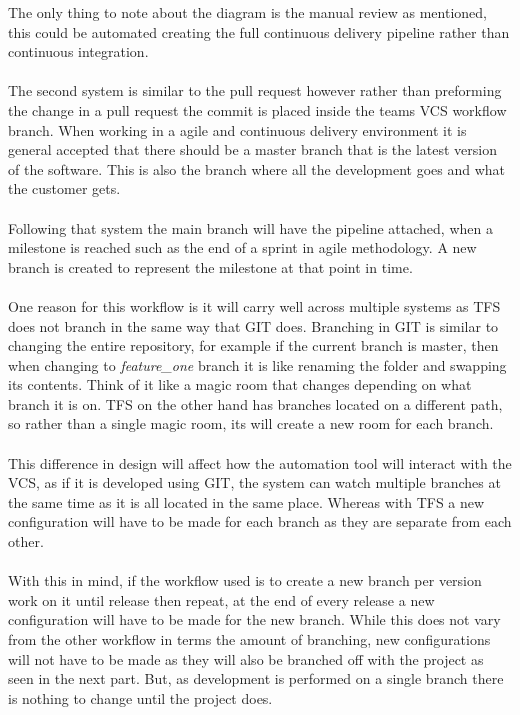 The only thing to note about the diagram is the manual review as mentioned, this could be automated creating the full continuous delivery pipeline rather than continuous integration.
\\\\
The second system is similar to the pull request however rather than preforming the change in a pull request the commit is placed inside the teams VCS workflow branch. When working in a agile and continuous delivery environment it is general accepted that there should be a master branch that is the latest version of the software. This is also the branch where all the development goes and what the customer gets.
\\\\
Following that system the main branch will have the pipeline attached, when a milestone is reached such as the end of a sprint in agile methodology. A new branch is created to represent the milestone at that point in time. 
\\\\
One reason for this workflow is it will carry well across multiple systems as TFS does not branch in the same way that GIT does. Branching in GIT is similar to changing the entire repository, for example if the current branch is master, then when changing to \textit{feature\_one} branch it is like renaming the folder and swapping its contents. Think of it like a magic room that changes depending on what branch it is on. TFS on the other hand has branches located on a different path, so rather than a single magic room, its will create a new room for each branch.
\\\\
This difference in design will affect how the automation tool will interact with the VCS, as if it is developed using GIT, the system can watch multiple branches at the same time as it is all located in the same place. Whereas with TFS a new configuration will have to be made for each branch as they are separate from each other.
\\\\
With this in mind, if the workflow used is to create a new branch per version work on it until release then repeat, at the end of every release a new configuration will have to be made for the new branch. While this does not vary from the other workflow in terms the amount of branching, new configurations will not have to be made as they will also be branched off with the project as seen in the next part. But, as development is performed on a single branch there is nothing to change until the project does.
